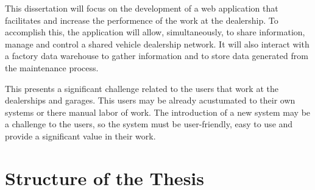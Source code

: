 This dissertation will focus on the development of a web application that facilitates and increase the performence of the work at the dealership.
To accomplish this, the application will allow, simultaneously, to share information, manage and control a shared vehicle dealership network.
It will also interact with a factory data warehouse to gather information and to store data generated from the maintenance process. 

This presents a significant challenge related to the users that work at the dealerships and garages. 
This users may be already acustumated to their own systems or there manual labor of work.  
The introduction of a new system may be a challenge to the users, so the system must be user-friendly, easy to use and provide a significant value in their work.

\section{Structure of the Thesis}

